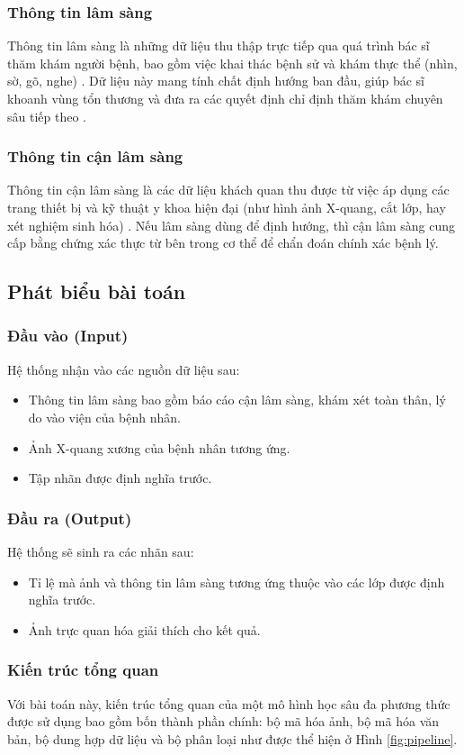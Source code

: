 \begin{refsection}
  \subsubsection{Thông tin lâm sàng}
Thông tin lâm sàng là những dữ liệu thu thập trực tiếp qua quá trình bác sĩ thăm khám người bệnh, bao gồm việc khai thác bệnh sử và khám thực thể (nhìn, sờ, gõ, nghe) \cite{Dorland2011}. Dữ liệu này mang tính chất định hướng ban đầu, giúp bác sĩ khoanh vùng tổn thương và đưa ra các quyết định chỉ định thăm khám chuyên sâu tiếp theo \cite{Bickley2020_Bates}.
  \subsubsection{Thông tin cận lâm sàng}
Thông tin cận lâm sàng là các dữ liệu khách quan thu được từ việc áp dụng các trang thiết bị và kỹ thuật y khoa hiện đại (như hình ảnh X-quang, cắt lớp, hay xét nghiệm sinh hóa) \cite{Dorland2011}. Nếu lâm sàng dùng để định hướng, thì cận lâm sàng cung cấp bằng chứng xác thực từ bên trong cơ thể để chẩn đoán chính xác bệnh lý.

  \subsection{Phát biểu bài toán}
  \subsubsection{Đầu vào (Input)}
Hệ thống nhận vào các nguồn dữ liệu sau:
  \begin{itemize}
      \item Thông tin lâm sàng bao gồm báo cáo cận lâm sàng, khám xét toàn thân, lý do vào viện của bệnh nhân.
      \item Ảnh X-quang xương của bệnh nhân tương ứng.
      \item Tập nhãn được định nghĩa trước.
  \end{itemize}
  \subsubsection{Đầu ra (Output)}
Hệ thống sẽ sinh ra các nhãn sau:
  \begin{itemize}
      \item Tỉ lệ mà ảnh và thông tin lâm sàng tương ứng thuộc vào các lớp được định nghĩa trước.
      \item Ảnh trực quan hóa giải thích cho kết quả.
  \end{itemize}
  \subsubsection{Kiến trúc tổng quan}
Với bài toán này, kiến trúc tổng quan của một mô hình học sâu đa phương thức được sử dụng bao gồm bốn thành phần chính: bộ mã hóa ảnh, bộ mã hóa văn bản, bộ dung hợp dữ liệu và bộ phân loại như được thể hiện ở Hình \ref{fig:pipeline}.


\end{refsection}

